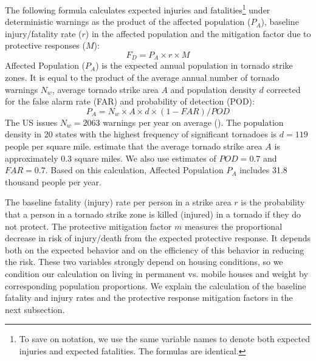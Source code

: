\documentclass{ametsocV6.1}
\begin{document}
The following formula calculates expected injuries and fatalities\footnote{To save on notation, we use the same variable names to denote both expected injuries and expected fatalities. The formulas are identical.} under deterministic warnings as the product of the affected population ($P_A$), baseline injury/fatality rate ($r$) in the affected population and the mitigation factor due to protective responses ($M$):
$$F_D=P_A \times r \times M$$
Affected Population ($P_A$) is the expected annual population in tornado strike zones. It is equal to the product of the average annual number of tornado warnings $N_w$, average tornado strike area $A$ and population density $d$ corrected for the false alarm rate (FAR) and probability of detection (POD):
$$P_A= N_w \times A \times d \times (1-FAR)/POD$$
The US issues $N_w=2063$ warnings per year on average (\citet{howard_firm_2021}). The population density in 20 states with the highest frequency of significant tornadoes is $d=119$ people per square mile. \citet{simmons_economic_2013} estimate that the average tornado strike area $A$ is approximately 0.3 square miles. We also use estimates of $POD=0.7$ and $FAR=0.7$. Based on this calculation, Affected Population $P_A$ includes 31.8 thousand people per year. 

The baseline fatality (injury) rate per person in a strike area $r$ is the probability that a person in a tornado strike zone is killed (injured) in a tornado if they do not protect. The protective mitigation factor $m$ measures the proportional decrease in risk of injury/death from the expected protective response. It depends both on the expected behavior and on the efficiency of this behavior in reducing the risk. These two variables strongly depend on housing conditions, so we condition our calculation on living in permanent vs. mobile houses and weight by corresponding population proportions. We explain the calculation of the baseline fatality and injury rates and the protective response mitigation factors in the next subsection.
\end{document}
